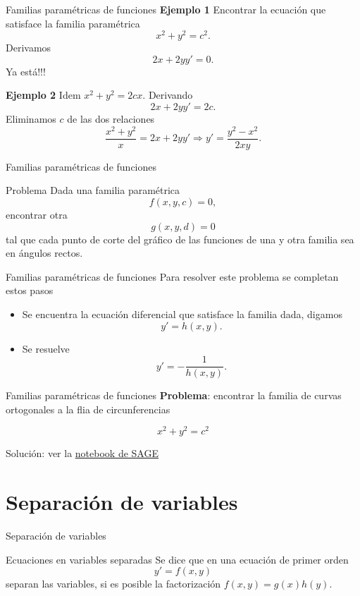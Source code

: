 \documentclass[handout,hyperref={colorlinks=true}]{beamer}
\begin{document}
\begin{frame}{Familias paramétricas de funciones} 
\textbf{Ejemplo 1} Encontrar la ecuación que satisface la familia paramétrica
\[x^2+y^2=c^2.\]
Derivamos
\[2x+2yy'=0.\]
Ya está!!!

\textbf{Ejemplo 2} Idem $x^2+y^2=2cx$.  Derivando
\[2x+2yy'=2c.\]
Eliminamos $c$ de las dos relaciones
\[\frac{x^2+y^2}{x}=2x+2yy'\Rightarrow \boxed{y'=\frac{y^2-x^2}{2xy}}.\]

\end{frame}

\begin{frame}{Familias paramétricas de funciones} 
\begin{block}{Problema}
 Dada una familia paramétrica
 \[f(x,y,c)=0,\]
 encontrar otra
 \[g(x,y,d)=0\]
 tal que cada punto de corte del gráfico de las funciones de una y otra familia sea en ángulos rectos. 
\end{block}


\end{frame}

\begin{frame}{Familias paramétricas de funciones} 
Para resolver este problema se completan estos pasos
\begin{itemize}
 \item Se encuentra la ecuación diferencial que satisface la familia dada, digamos
 \[y'=h(x,y).\]
 \item Se resuelve
 \[y'=-\frac{1}{h(x,y)}.\]
\end{itemize}



\end{frame}

\begin{frame}{Familias paramétricas de funciones} 
 \textbf{Problema}: encontrar la familia de curvas ortogonales a la flia de circunferencias

\[x^2+y^2=c^2\]

Solución: ver la \href{https://sage.ccad.unrc.edu.ar/home/pub/63/}{notebook de SAGE}
\end{frame}

\section{Separación de variables}
\begin{frame}{Separación de variables}
\begin{block}{Ecuaciones en variables separadas} Se dice que en una ecuación de primer orden
 \[y'=f(x,y)\]
 separan las variables, si es posible la factorización $f(x,y)=g(x)h(y)$.
 \end{block}



\end{frame}
\end{document}
